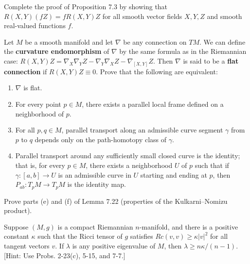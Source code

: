 \begin{exercise}
\label{prob:curvature-multilinearity-in-functions}
Complete the proof of Proposition 7.3 by showing that $R(X,Y)(fZ) = fR(X,Y)Z$ for all smooth vector fields $X,Y,Z$ and smooth real-valued functions $f$.
\end{exercise}

\begin{exercise}
\label{prob:flat-connection}
Let $M$ be a smooth manifold and let $\nabla$ be any connection on $TM$. We can define the \textbf{curvature endomorphism} of $\nabla$ by the same formula as in the Riemannian case: $R(X,Y)Z = \nabla_X \nabla_Y Z - \nabla_Y \nabla_X Z - \nabla_{[X,Y]}Z$. Then $\nabla$ is said to be a \textbf{flat connection} if $R(X,Y)Z \equiv 0$. Prove that the following are equivalent:
\begin{enumerate}
\item[(a)] $\nabla$ is flat.
\item[(b)] For every point $p \in M$, there exists a parallel local frame defined on a neighborhood of $p$.
\item[(c)] For all $p,q \in M$, parallel transport along an admissible curve segment $\gamma$ from $p$ to $q$ depends only on the path-homotopy class of $\gamma$.
\item[(d)] Parallel transport around any sufficiently small closed curve is the identity; that is, for every $p \in M$, there exists a neighborhood $U$ of $p$ such that if $\gamma : [a,b] \to U$ is an admissible curve in $U$ starting and ending at $p$, then $P_{ab} : T_p M \to T_p M$ is the identity map.
\end{enumerate}
\end{exercise}

\begin{exercise}
\label{prob:kulkarni-nomizu-properties}
Prove parts (e) and (f) of Lemma 7.22 (properties of the Kulkarni--Nomizu product).
\end{exercise}

\begin{exercise}
\label{prob:lichnerowicz-theorem}
Suppose $(M, g)$ is a compact Riemannian $n$-manifold, and there is a positive constant $\kappa$ such that the Ricci tensor of $g$ satisfies $Rc(v, v) \geq \kappa|v|^2$ for all tangent vectors $v$. If $\lambda$ is any positive eigenvalue of $M$, then $\lambda \geq n\kappa/(n-1)$. [Hint: Use Probs. 2-23(c), 5-15, and 7-7.]
\end{exercise}

